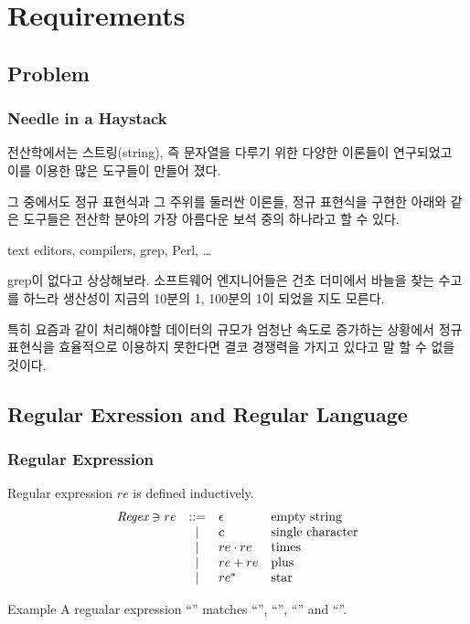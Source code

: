 \section{Requirements}

\subsection{Problem}

\begin{frame}
\frametitle{Needle in a Haystack}

전산학에서는 스트링(string), 즉 문자열을 다루기 위한 다양한 이론들이 연구되었고 
이를 이용한 많은 도구들이 만들어 졌다.

그 중에서도 정규 표현식과 그 주위를 둘러싼 이론들,
정규 표현식을 구현한 아래와 같은 도구들은 전산학 분야의 가장 
아름다운 보석 중의 하나라고 할 수 있다.

\begin{center}
text editors, compilers, grep, Perl, \dots
\end{center}

grep이 없다고 상상해보라. 소프트웨어 엔지니어들은 건초 더미에서 바늘을 찾는 
수고를 하느라 생산성이 지금의 10분의 1, 100분의 1이 되었을 지도 모른다.

특히 요즘과 같이 처리해야할 데이터의 규모가 엄청난 속도로 증가하는 상황에서
정규 표현식을 효율적으로 이용하지 못한다면 결코 경쟁력을 가지고 있다고
말 할 수 없을 것이다.

\end{frame}

\subsection{Regular Exression and Regular Language}

\begin{frame}
\frametitle{Regular Expression}

Regular expression $re$ is defined inductively.%
\[
\begin{array}{lcll}
    \textit{Regex} \ni   re & ::= & \epsilon & \mbox{\rm empty string} \\
   & | & c & \mbox{\rm single character} \\
   & | & re \cdot re & \mbox{\rm times} \\
   & | & re + re & \mbox{plus} \\
   & | & re^{*} & \mbox{star}
\end{array}
\]

\begin{block}{Example}
    A regualar expression ``'' matches ``'', ``'', ``'' and ``''.
\end{block}

\end{frame}

